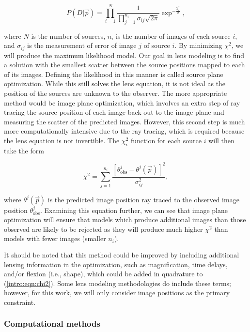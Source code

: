 \begin{equation}
P(D | \vec{p} ) = \prod_{i=1}^N \frac{1}{  \prod_{j=1}^{n_i} \sigma_{ij} \sqrt{2\pi} } \exp^{-\frac{\chi_i^2}{2}},
\label{intro:eqn:likelihood}
\end{equation}

\noindent where $N$ is the number of sources, $n_i$ is the number of images of each source $i$, and $\sigma_{ij}$ is the measurement of error of image $j$ of source $i$. By minimizing $\chi^2$, we will produce the maximum likelihood model. Our goal in lens modeling is to find a solution with the smallest scatter between the source positions mapped to each of its images. Defining the likelihood in this manner is called source plane optimization. While this still solves the lens equation, it is not ideal as the position of the sources are unknown to the observer. The more appropriate method would be image plane optimization, which involves an extra step of ray tracing the source position of each image back out to the image plane and measuring the scatter of the predicted images. However, this second step is much more computationally intensive due to the ray tracing, which is required because the lens equation is not invertible. The $\chi_i^2$ function for each source $i$ will then take the form

\begin{equation}
\chi^2 = \sum_{j=1}^{n_i} \frac{[\theta_\mathrm{obs}^j - \theta^j (\vec{p})]^2}{\sigma_{ij}^2},
\label{intro:eqn:chi2}
\end{equation}

\noindent where $\theta^j (\vec{p})$ is the predicted image position ray traced to the observed image position $\theta_\mathrm{obs}^j$. Examining this equation further, we can see that image plane optimization will ensure that models which produce additional images than those observed are likely to be rejected as they will produce much higher $\chi^2$ than models with fewer images (smaller $n_i$).

It should be noted that this method could be improved by including additional lensing information in the optimization, such as magnification, time delays, and/or flexion (i.e., shape), which could be added in quadrature to (\ref{intro:eqn:chi2}). Some lens modeling methodologies do include these terms; however, for this work, we will only consider image positions as the primary constraint.

\subsubsection{Computational methods}

